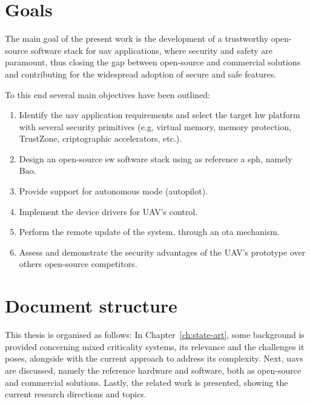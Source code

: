 %

\section{Goals}
The main goal of the present work is the development of a trustworthy
open-source software stack for \gls{uav} applications, where security and safety
are paramount, thus closing the gap between open-source and commercial solutions
and contributing for the widespread adoption of secure and safe features.

To this end several main objectives have been outlined:
\begin{enumerate}
\item Identify the \gls{uav} application requirements and select the target
  \gls{hw} platform with several security primitives
  (e.g, virtual memory, memory protection, TrustZone, criptographic
  accelerators, etc.).
\item Design an open-source \gls{sw} software stack using as reference a
  \gls{sph}, namely Bao.
\item Provide support for autonomous mode (autopilot).
\item Implement the device drivers for UAV's control.
\item Perform the remote update of the system, through an \gls{ota} mechanism.
\item Assess and demonstrate the security advantages of the UAV's prototype over
  others open-source competitors.
\end{enumerate}

\section{Document structure}
This thesis is organised as follows:
In Chapter~\ref{ch:state-art}, some background is provided concerning mixed criticality
systems, its relevance and the challenges it poses, alongside with the current
approach to address its complexity.
Next, \glspl{uav} are discussed,
namely the reference hardware and software, both as open-source and commercial
solutions. Lastly, the related work is
presented, showing the current research directions and topics.%

